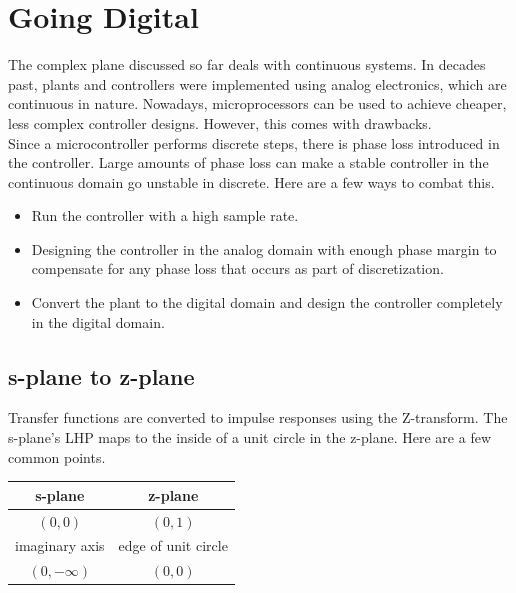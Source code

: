 \documentclass[10pt,conference,compsoc]{IEEEtran}
\begin{document}
\section{Going Digital}

\noindent The complex plane discussed so far deals with continuous systems. In
decades past, \glspl{plant} and controllers were implemented using analog electronics,
which are continuous in nature. Nowadays, microprocessors can be used to achieve
cheaper, less complex controller designs. However, this comes with drawbacks. \\

\noindent Since a microcontroller performs discrete steps, there is phase loss
introduced in the controller. Large amounts of phase loss can make a stable
controller in the continuous domain go unstable in discrete. Here are a few ways
to combat this.

\begin{itemize}
  \item Run the controller with a high sample rate.
  \item Designing the controller in the analog domain with enough phase margin to compensate for any phase loss that occurs as part of discretization.
  \item Convert the plant to the digital domain and design the controller
    completely in the digital domain.
\end{itemize}

\subsection{s-plane to z-plane}

\noindent Transfer functions are converted to impulse responses using the
Z-transform. The s-plane's LHP maps to the inside of a unit circle in the
z-plane. Here are a few common points.

\begin{table}[ht]
  \renewcommand{\arraystretch}{1.3}
  \centering
  \begin{tabular}{|cc|}
    \hline
    \textbf{s-plane} & \textbf{z-plane} \\
    \hline
    $(0, 0)$ & $(0, 1)$ \\
    imaginary axis & edge of unit circle \\
    $(0, -\infty)$ & $(0, 0)$ \\
    \hline
  \end{tabular}
  \label{tab:s-plane2z-plane}
\end{table}
\end{document}
